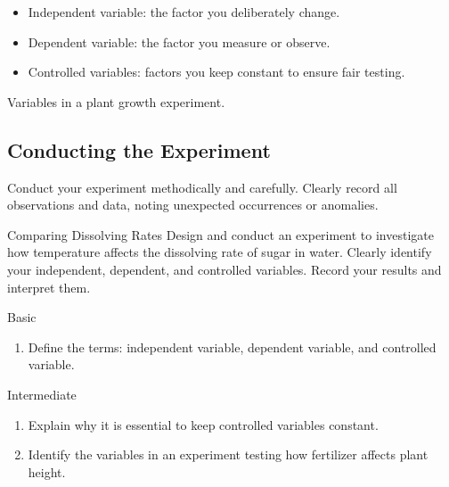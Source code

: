 \begin{itemize}
    \item Independent variable: the factor you deliberately change.
    \item Dependent variable: the factor you measure or observe.
    \item Controlled variables: factors you keep constant to ensure fair testing.
\end{itemize}

\begin{marginfigure}
  \caption{Variables in a plant growth experiment.}
  \label{fig:variables}
\end{marginfigure}


\subsection{Conducting the Experiment}

Conduct your experiment methodically and carefully. Clearly record all observations and data, noting unexpected occurrences or anomalies.

\begin{investigation}{Comparing Dissolving Rates}
Design and conduct an experiment to investigate how temperature affects the dissolving rate of sugar in water. Clearly identify your independent, dependent, and controlled variables. Record your results and interpret them.
\end{investigation}

\begin{tieredquestions}{Basic}
\begin{enumerate}
    \item Define the terms: independent variable, dependent variable, and controlled variable.
\end{enumerate}
\end{tieredquestions}

\begin{tieredquestions}{Intermediate}
\begin{enumerate}
    \item Explain why it is essential to keep controlled variables constant.
    \item Identify the variables in an experiment testing how fertilizer affects plant height.
\end{enumerate}
\end{tieredquestions}

